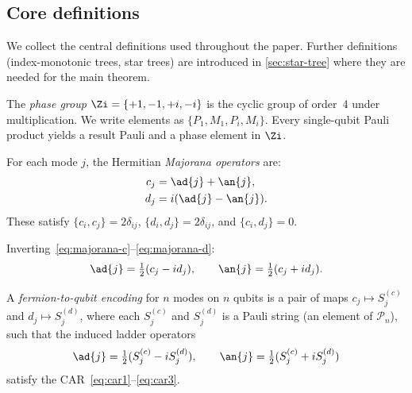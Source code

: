 \subsection{Core definitions}
\label{sec:core-defs}

We collect the central definitions used throughout the paper.  Further
definitions (index-monotonic trees, star trees) are introduced in
\cref{sec:star-tree} where they are needed for the main theorem.

\begin{definition}
\label{def:phase-group}
The \emph{phase group} $\Zi = \{+1, -1, +i, -i\}$ is the cyclic group
of order~4 under multiplication.  We write elements as $\{P_1, M_1,
P_i, M_i\}$.  Every single-qubit Pauli product yields a result Pauli
and a phase element in $\Zi$.
\end{definition}

\begin{definition}
\label{def:majorana}
For each mode $j$, the Hermitian \emph{Majorana operators} are:
\begin{align}
  c_j &= \ad{j} + \an{j}, \label{eq:majorana-c} \\
  d_j &= i(\ad{j} - \an{j}). \label{eq:majorana-d}
\end{align}
These satisfy $\{c_i, c_j\} = 2\delta_{ij}$,
$\{d_i, d_j\} = 2\delta_{ij}$, and $\{c_i, d_j\} = 0$.
\end{definition}

\noindent
Inverting~\eqref{eq:majorana-c}--\eqref{eq:majorana-d}:
\begin{equation}
  \ad{j} = \tfrac{1}{2}(c_j - id_j), \qquad
  \an{j} = \tfrac{1}{2}(c_j + id_j).
  \label{eq:ladder-from-majorana}
\end{equation}

\begin{definition}
\label{def:encoding}
A \emph{fermion-to-qubit encoding} for $n$ modes on $n$ qubits is a
pair of maps $c_j \mapsto S_j^{(c)}$ and $d_j \mapsto S_j^{(d)}$, where
each $S_j^{(c)}$ and $S_j^{(d)}$ is a Pauli string (an element of
$\mathcal{P}_n$), such that the induced ladder operators
\begin{equation}
  \ad{j} = \tfrac{1}{2}(S_j^{(c)} - i S_j^{(d)}), \qquad
  \an{j} = \tfrac{1}{2}(S_j^{(c)} + i S_j^{(d)})
  \label{eq:encoded-ladder}
\end{equation}
satisfy the CAR~\eqref{eq:car1}--\eqref{eq:car3}.
\end{definition}

